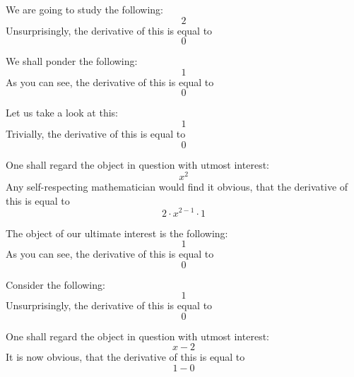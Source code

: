 \documentclass{article}
\begin{document}
We are going to study the following:
\begin{equation}
2 
\end{equation}
Unsurprisingly, the derivative of this is equal to
\begin{equation}
0 
\end{equation}

We shall ponder the following:
\begin{equation}
1 
\end{equation}
As you can see, the derivative of this is equal to
\begin{equation}
0 
\end{equation}

Let us take a look at this:
\begin{equation}
1 
\end{equation}
Trivially, the derivative of this is equal to
\begin{equation}
0 
\end{equation}

One shall regard the object in question with utmost interest:
\begin{equation}
x ^{2 } 
\end{equation}
Any self-respecting mathematician would find it obvious, that the derivative of this is equal to
\begin{equation}
2 \cdot x ^{2 - 1 } \cdot 1 
\end{equation}

The object of our ultimate interest is the following:
\begin{equation}
1 
\end{equation}
As you can see, the derivative of this is equal to
\begin{equation}
0 
\end{equation}

Consider the following:
\begin{equation}
1 
\end{equation}
Unsurprisingly, the derivative of this is equal to
\begin{equation}
0 
\end{equation}

One shall regard the object in question with utmost interest:
\begin{equation}
x - 2 
\end{equation}
It is now obvious, that the derivative of this is equal to
\begin{equation}
1 - 0 
\end{equation}
\end{document}
